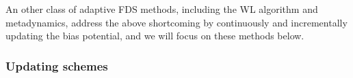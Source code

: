 \documentclass[reprint, superscriptaddress, floatfix]{revtex4-1}
\begin{document}
An other class of adaptive FDS methods,
including the WL algorithm\cite{wang2001, *wang2001pre}
and metadynamics\cite{huber1994, laio2002, *laio2008, *barducci2011, *sutto2012},
address the above shortcoming
by continuously and incrementally updating the bias potential,
and we will focus on these methods below.


\subsubsection{Updating schemes}
\end{document}
